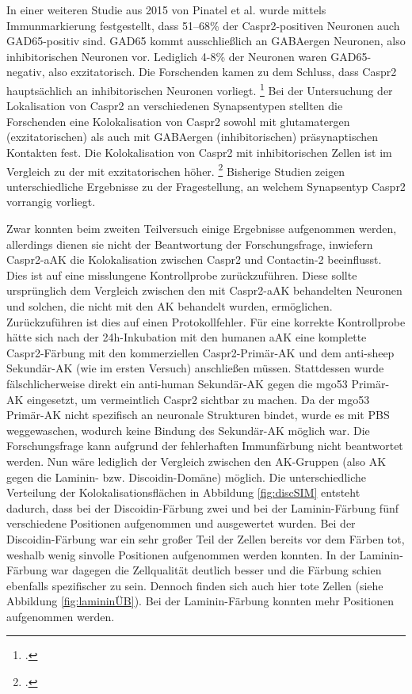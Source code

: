 In einer weiteren Studie aus 2015 von Pinatel et al. wurde mittels Immunmarkierung festgestellt, dass 51–68\% der Caspr2-positiven Neuronen auch GAD65-positiv sind. GAD65 kommt ausschließlich an GABAergen Neuronen, also inhibitorischen Neuronen vor. Lediglich 4-8\% der Neuronen waren GAD65-negativ, also exzitatorisch. Die Forschenden kamen zu dem Schluss, dass Caspr2 hauptsächlich an inhibitorischen Neuronen vorliegt. \footcite[S.~4]{Pinatel2015} Bei der Untersuchung der Lokalisation von Caspr2 an verschiedenen Synapsentypen stellten die Forschenden eine Kolokalisation von Caspr2 sowohl mit glutamatergen (exzitatorischen) als auch mit GABAergen (inhibitorischen) präsynaptischen Kontakten fest. Die Kolokalisation von Caspr2 mit inhibitorischen Zellen ist im Vergleich zu der mit exzitatorischen höher. \footcite[S.~4--6]{Pinatel2015}
Bisherige Studien zeigen unterschiedliche Ergebnisse zu der Fragestellung, an welchem Synapsentyp Caspr2 vorrangig vorliegt.

Zwar konnten beim zweiten Teilversuch einige Ergebnisse aufgenommen werden, allerdings dienen sie nicht der Beantwortung der Forschungsfrage, inwiefern Caspr2-aAK die Kolokalisation zwischen Caspr2 und Contactin-2 beeinflusst. 
Dies ist auf eine misslungene Kontrollprobe zurückzuführen. Diese sollte ursprünglich dem Vergleich zwischen den mit Caspr2-aAK behandelten Neuronen und solchen, die nicht mit den AK behandelt wurden, ermöglichen.
Zurückzuführen ist dies auf einen Protokollfehler. Für eine korrekte Kontrollprobe hätte sich nach der 24h-Inkubation mit den humanen aAK eine komplette Caspr2-Färbung mit den kommerziellen Caspr2-Primär-AK und dem anti-sheep Sekundär-AK (wie im ersten Versuch) anschließen müssen. Stattdessen wurde fälschlicherweise direkt ein anti-human Sekundär-AK gegen die mgo53 Primär-AK eingesetzt, um vermeintlich Caspr2 sichtbar zu machen. Da der mgo53 Primär-AK nicht spezifisch an neuronale Strukturen bindet, wurde es mit PBS weggewaschen, wodurch keine Bindung des Sekundär-AK möglich war.
Die Forschungsfrage kann aufgrund der fehlerhaften Immunfärbung nicht beantwortet werden. 
Nun wäre lediglich der Vergleich zwischen den AK-Gruppen (also AK gegen die Laminin- bzw. Discoidin-Domäne) möglich.
Die unterschiedliche Verteilung der Kolokalisationsflächen in Abbildung \ref{fig:discSIM} entsteht dadurch, dass bei der Discoidin-Färbung zwei und bei der Laminin-Färbung fünf verschiedene Positionen aufgenommen und ausgewertet wurden. Bei der Discoidin-Färbung war ein sehr großer Teil der Zellen bereits vor dem Färben tot, weshalb wenig sinvolle Positionen aufgenommen werden konnten. In der Laminin-Färbung war dagegen die Zellqualität deutlich besser und die Färbung schien ebenfalls spezifischer zu sein. Dennoch finden sich auch hier tote Zellen (siehe Abbildung \ref{fig:lamininÜB}). Bei der Laminin-Färbung konnten mehr Positionen aufgenommen werden. 
\clearpage

